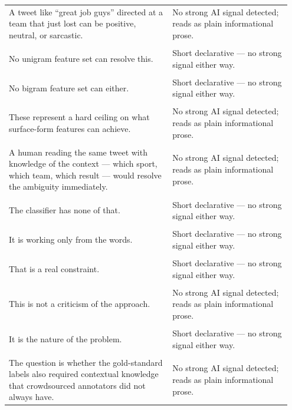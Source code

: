 \documentclass[11pt]{article}
\begin{document}
\begin{longtable}{|p{0.55\linewidth}|p{0.40\linewidth}|}
\rule{0pt}{3.5cm} & \\
\hline
A tweet like ``great job guys'' directed at a team that just lost can be positive, neutral, or sarcastic. & No strong AI signal detected; reads as plain informational prose. \\[2pt]
\hline
\rule{0pt}{3.5cm} & \\
\hline
No unigram feature set can resolve this. & Short declarative --- no strong signal either way. \\[2pt]
\hline
\rule{0pt}{3.5cm} & \\
\hline
No bigram feature set can either. & Short declarative --- no strong signal either way. \\[2pt]
\hline
\rule{0pt}{3.5cm} & \\
\hline
These represent a hard ceiling on what surface-form features can achieve. & No strong AI signal detected; reads as plain informational prose. \\[2pt]
\hline
\rule{0pt}{3.5cm} & \\
\hline
A human reading the same tweet with knowledge of the context --- which sport, which team, which result --- would resolve the ambiguity immediately. & No strong AI signal detected; reads as plain informational prose. \\[2pt]
\hline
\rule{0pt}{3.5cm} & \\
\hline
The classifier has none of that. & Short declarative --- no strong signal either way. \\[2pt]
\hline
\rule{0pt}{3.5cm} & \\
\hline
It is working only from the words. & Short declarative --- no strong signal either way. \\[2pt]
\hline
\rule{0pt}{3.5cm} & \\
\hline
That is a real constraint. & Short declarative --- no strong signal either way. \\[2pt]
\hline
\rule{0pt}{3.5cm} & \\
\hline
This is not a criticism of the approach. & No strong AI signal detected; reads as plain informational prose. \\[2pt]
\hline
\rule{0pt}{3.5cm} & \\
\hline
It is the nature of the problem. & Short declarative --- no strong signal either way. \\[2pt]
\hline
\rule{0pt}{3.5cm} & \\
\hline
The question is whether the gold-standard labels also required contextual knowledge that crowdsourced annotators did not always have. & No strong AI signal detected; reads as plain informational prose. \\[2pt]

\end{longtable}
\end{document}
